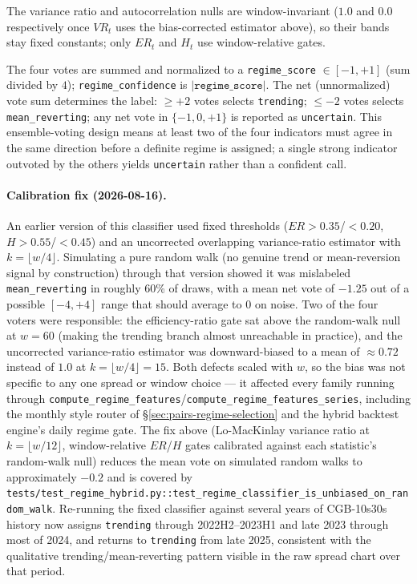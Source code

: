 The variance ratio and autocorrelation nulls are window-invariant ($1.0$ and $0.0$
respectively once $VR_t$ uses the bias-corrected estimator above), so their bands stay
fixed constants; only $ER_t$ and $H_t$ use window-relative gates.

The four votes are summed and normalized to a \texttt{regime\_score} $\in [-1, +1]$ (sum
divided by $4$); \texttt{regime\_confidence} is $\left|\texttt{regime\_score}\right|$. The
net (unnormalized) vote sum determines the label: $\ge +2$ votes selects
\texttt{trending}; $\le -2$ votes selects \texttt{mean\_reverting}; any net vote in
$\{-1, 0, +1\}$ is reported as \texttt{uncertain}. This ensemble-voting design means at
least two of the four indicators must agree in the same direction before a definite
regime is assigned; a single strong indicator outvoted by the others yields
\texttt{uncertain} rather than a confident call.

\paragraph{Calibration fix (2026-08-16).} An earlier version of this classifier used
fixed thresholds ($ER>0.35$/$<0.20$, $H>0.55$/$<0.45$) and an uncorrected overlapping
variance-ratio estimator with $k=\lfloor w/4\rfloor$. Simulating a pure random walk
(no genuine trend or mean-reversion signal by construction) through that version showed
it was mislabeled \texttt{mean\_reverting} in roughly 60\% of draws, with a mean net vote
of $-1.25$ out of a possible $[-4,+4]$ range that should average to $0$ on noise. Two of
the four voters were responsible: the efficiency-ratio gate sat above the random-walk
null at $w=60$ (making the trending branch almost unreachable in practice), and the
uncorrected variance-ratio estimator was downward-biased to a mean of $\approx 0.72$
instead of $1.0$ at $k=\lfloor w/4\rfloor=15$. Both defects scaled with $w$, so the bias
was not specific to any one spread or window choice --- it affected every family running
through \texttt{compute\_regime\_features}/\texttt{compute\_regime\_features\_series},
including the monthly style router of \S\ref{sec:pairs-regime-selection} and the hybrid
backtest engine's daily regime gate. The fix above (Lo-MacKinlay variance ratio at
$k=\lfloor w/12\rfloor$, window-relative $ER$/$H$ gates calibrated against each
statistic's random-walk null) reduces the mean vote on simulated random walks to
approximately $-0.2$ and is covered by
\texttt{tests/test\_regime\_hybrid.py::test\_regime\_classifier\_is\_unbiased\_on\_random\_walk}.
Re-running the fixed classifier against several years of CGB-10s30s history now assigns
\texttt{trending} through 2022H2--2023H1 and late 2023 through most of 2024, and returns
to \texttt{trending} from late 2025, consistent with the qualitative trending/mean-reverting
pattern visible in the raw spread chart over that period.

